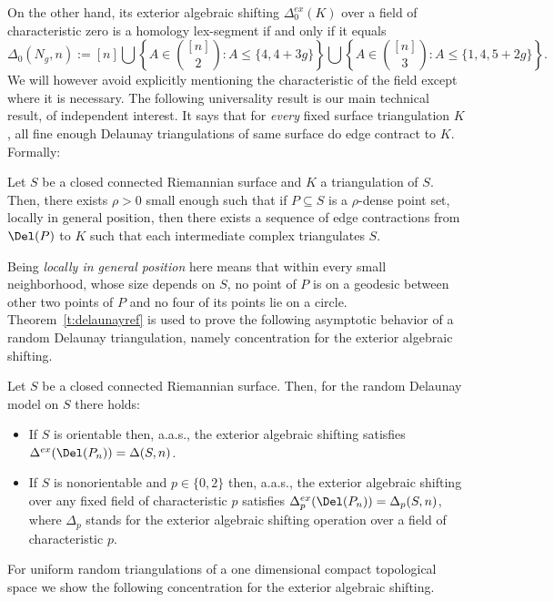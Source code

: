 On the other hand, its exterior algebraic shifting 
$\Delta_0^{ex}(K)$ over a field of characteristic zero
is a homology lex-segment if and only if it equals
$$\Delta_0(N_g, n):= [n] \bigcup \left \{A\in \binom{[n]}{2}\colon A \leq \{4,4+3g\} \right \} \bigcup \left \{ A\in \binom{[n]}{3} \colon A \leq \{1,4,5+2g\} \right \}.$$
We will however avoid explicitly mentioning the characteristic of the field except where it is necessary.
%
The following universality result is our main technical result, of independent interest. It says that for \emph{every} fixed surface triangulation $K$, all fine enough Delaunay triangulations of same surface do edge contract to $K$. Formally:
\begin{theorem}
    \label{t:delaunayref}
    Let $S$ be a closed connected Riemannian surface and $K$ a triangulation of $S$. Then, there exists $\rho>0$ small enough such that if $P\subseteq S$ is a $\rho$-dense point set, locally in general position, then there exists a sequence of edge contractions from $\Del(P)$ to $K$ such that each intermediate complex triangulates $S$.
\end{theorem}
Being \emph{locally in general position} here means that within every small neighborhood, whose size depends on $S$, no point of $P$ is on a geodesic between other two points of $P$ and no four of its points lie on a circle.
Theorem~\ref{t:delaunayref} is used to prove the following asymptotic behavior of a random Delaunay triangulation, namely concentration for the exterior algebraic shifting.
\begin{theorem}\label{t:aasDelauney}
Let $S$ be a closed connected Riemannian surface. Then, for the random Delaunay model on $S$ there holds:
\begin{itemize}
    \item If $S$ is orientable then, a.a.s., the exterior algebraic shifting satisfies
$\Delta^{ex}(\Del(P_n))
    =\Delta(S,n)
    $.
    \item If $S$ is nonorientable and $p\in \{0,2\}$ then, a.a.s., 
the exterior algebraic shifting over any fixed field of characteristic $p$ satisfies $\Delta^{ex}_p(\Del(P_n)) 
    =\Delta_p(S,n)$,
    where $\Delta_p$ stands for the exterior algebraic shifting operation over a field of characteristic $p$.
\end{itemize}
%
%
\end{theorem}
For uniform random triangulations of a one dimensional compact topological space we show the following concentration for the exterior algebraic shifting.
